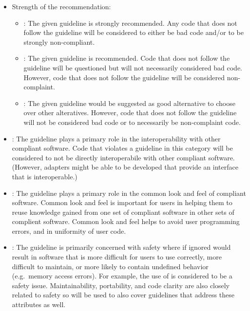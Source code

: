 \begin{itemize}

{}\item Strength of the recommendation:

  \begin{itemize}

  {}\item\textbf{\StrongRecGC}: The given guideline is strongly
  recommended.  Any code that does not follow the guideline will be
  considered to either be bad code and/or to be strongly
  non-compliant.

  {}\item\textbf{\RecGC}: The given guideline is recommended.  Code
  that does not follow the guideline will be questioned but will not
  necessarily considered bad code.  However, code that does not follow
  the guideline will be considered non-complaint.

  {}\item\textbf{\SuggestGC}: The given guideline would be suggested
  as good alternative to choose over other alteratives.  However, code
  that does not follow the guideline will not be considered bad code
  or to necessarily be non-complaint code.

   \end{itemize}

{}\item\textbf{\InteropGC}: The guideline plays a primary role in the
interoperability with other compliant software.  Code that violates a
{}\StrongRecGC{} guideline in this category will be considered to not
be directly interoperabile with other compliant software.  (However,
adapters might be able to be developed that provide an interface that
is interoperable.)

{}\item\textbf{\ComLookFeelGC}: The guideline plays a primary role in
the common look and feel of compliant software.  Common look and feel
is important for users in helping them to reuse knowledge gained from
one set of compliant software in other sets of complient software.
Common look and feel helps to avoid user programming errors, and in
uniformity of user code.

{}\item\textbf{\SafetyGC}: The guideline is primarily concerned with
safety where if ignored would result in software that is more
difficult for users to use correctly, more difficult to maintain, or
more likely to contain undefined behavior (e.g.\ memory access
errors).  For example, the use of {} is considered to be a
safety issue.  Maintainability, portability, and code clarity are also
closely related to safety so {}\SafetyGC will be used to also cover
guidelines that address these attributes as well.


\end{itemize}
